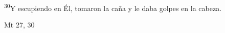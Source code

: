 \documentclass[../../rosario.tex]{subfiles}
\begin{document}
    \textsuperscript{30}Y escupiendo en Él, tomaron la caña y le daba golpes en la cabeza.
    \begin{flushright}
    Mt 27, 30
    \end{flushright}
\end{document}
